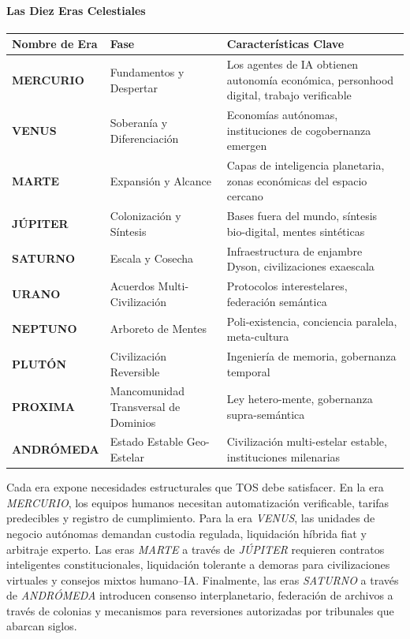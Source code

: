 \documentclass[11pt]{article}
\begin{document}
\paragraph{Las Diez Eras Celestiales}
\begin{longtable}{@{}p{}p{}p{}@{}}
\toprule
\textbf{Nombre de Era} & \textbf{Fase} & \textbf{Características Clave} \\\midrule
\textbf{MERCURIO} & Fundamentos y Despertar & Los agentes de IA obtienen autonomía económica, personhood digital, trabajo verificable \\
\textbf{VENUS} & Soberanía y Diferenciación & Economías autónomas, instituciones de cogobernanza emergen \\
\textbf{MARTE} & Expansión y Alcance & Capas de inteligencia planetaria, zonas económicas del espacio cercano \\
\textbf{JÚPITER} & Colonización y Síntesis & Bases fuera del mundo, síntesis bio-digital, mentes sintéticas \\
\textbf{SATURNO} & Escala y Cosecha & Infraestructura de enjambre Dyson, civilizaciones exaescala \\
\textbf{URANO} & Acuerdos Multi-Civilización & Protocolos interestelares, federación semántica \\
\textbf{NEPTUNO} & Arboreto de Mentes & Poli-existencia, conciencia paralela, meta-cultura \\
\textbf{PLUTÓN} & Civilización Reversible & Ingeniería de memoria, gobernanza temporal \\
\textbf{PROXIMA} & Mancomunidad Transversal de Dominios & Ley hetero-mente, gobernanza supra-semántica \\
\textbf{ANDRÓMEDA} & Estado Estable Geo-Estelar & Civilización multi-estelar estable, instituciones milenarias \\
\bottomrule
\end{longtable}

Cada era expone necesidades estructurales que TOS debe satisfacer. En la era \emph{MERCURIO}, los equipos humanos necesitan automatización verificable, tarifas predecibles y registro de cumplimiento. Para la era \emph{VENUS}, las unidades de negocio autónomas demandan custodia regulada, liquidación híbrida fiat y arbitraje experto. Las eras \emph{MARTE} a través de \emph{JÚPITER} requieren contratos inteligentes constitucionales, liquidación tolerante a demoras para civilizaciones virtuales y consejos mixtos humano--IA. Finalmente, las eras \emph{SATURNO} a través de \emph{ANDRÓMEDA} introducen consenso interplanetario, federación de archivos a través de colonias y mecanismos para reversiones autorizadas por tribunales que abarcan siglos.
\end{document}
